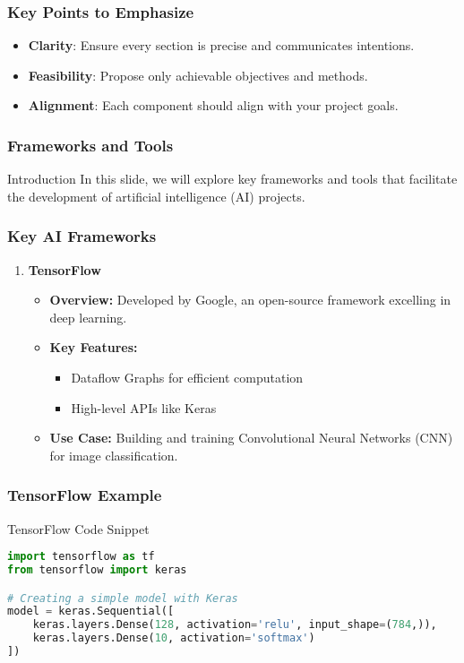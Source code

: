 \documentclass[aspectratio=169]{beamer}
\begin{document}
\begin{frame}[fragile]
    \frametitle{Key Points to Emphasize}
    \begin{itemize}
        \item \textbf{Clarity}: Ensure every section is precise and communicates intentions.
        \item \textbf{Feasibility}: Propose only achievable objectives and methods.
        \item \textbf{Alignment}: Each component should align with your project goals.
    \end{itemize}
\end{frame}

\begin{frame}
    \frametitle{Frameworks and Tools}
    \begin{block}{Introduction}
        In this slide, we will explore key frameworks and tools that facilitate the development of artificial intelligence (AI) projects. 
    \end{block}
\end{frame}

\begin{frame}
    \frametitle{Key AI Frameworks}
    \begin{enumerate}
        \item \textbf{TensorFlow}
            \begin{itemize}
                \item \textbf{Overview:} Developed by Google, an open-source framework excelling in deep learning.
                \item \textbf{Key Features:}
                    \begin{itemize}
                        \item Dataflow Graphs for efficient computation
                        \item High-level APIs like Keras
                    \end{itemize}
                \item \textbf{Use Case:} Building and training Convolutional Neural Networks (CNN) for image classification.
            \end{itemize}
    \end{enumerate}
\end{frame}

\begin{frame}[fragile]
    \frametitle{TensorFlow Example}
    \begin{block}{TensorFlow Code Snippet}
    \begin{lstlisting}[language=Python]
import tensorflow as tf
from tensorflow import keras

# Creating a simple model with Keras
model = keras.Sequential([
    keras.layers.Dense(128, activation='relu', input_shape=(784,)),
    keras.layers.Dense(10, activation='softmax')
])
    \end{lstlisting}
    \end{block}
\end{frame}
\end{document}
